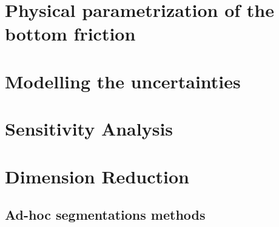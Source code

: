 \documentclass[../../Main_ManuscritThese.tex]{subfiles}
\begin{document}
\label{chap:croco}
\minitoc
\newpage
\subfileLocal{\pagestyle{contentStyle}}

\section{Physical parametrization of the bottom friction}

\section{Modelling the uncertainties}

\section{Sensitivity Analysis}

\section{Dimension Reduction}

\subsection{Ad-hoc segmentations methods}





\subfileLocal{
	\pagestyle{empty}
	
	
}
\end{document}
